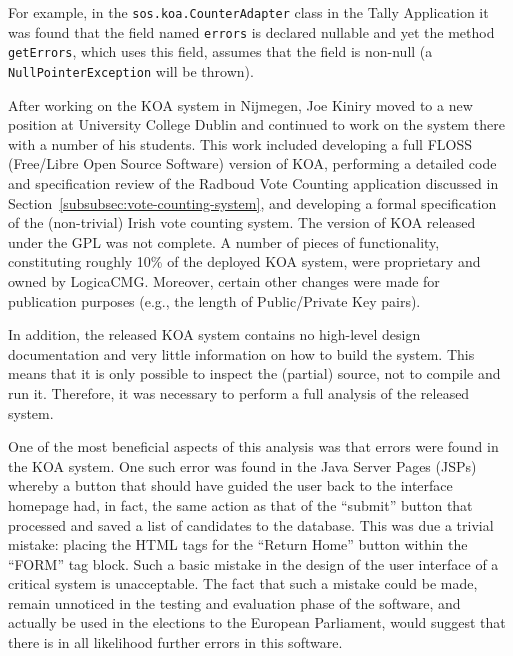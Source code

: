 \documentclass[times, 10pt, twocolumn]{article}
\begin{document}
For example, in the \texttt{sos.koa.CounterAdapter} class in the Tally 
Application it was found that the field named \texttt{errors} is declared 
nullable and yet the method \texttt{getErrors}, which uses this field, assumes 
that the field is non-null (a \texttt{NullPointerException} will be thrown).

After working on the KOA system in Nijmegen, Joe Kiniry moved to a new position 
at University College Dublin and continued to work on the system there with a 
number of his students.  This work included developing a full FLOSS (Free/Libre 
Open Source Software) version of KOA, performing a detailed code and 
specification review of the Radboud Vote Counting application discussed in 
Section~\ref{subsubsec:vote-counting-system}, and developing a formal 
specification of the (non-trivial) Irish vote counting system.
The version of KOA released under the GPL was not complete. A number of pieces 
of functionality, constituting roughly 10\% of the deployed KOA system, were 
proprietary and owned by LogicaCMG. Moreover, certain other changes were made 
for publication purposes (e.g., the length of Public/Private Key pairs).

In addition, the released KOA system contains no high-level design 
documentation and very little information on how to build the system. This 
means that it is only possible to inspect the (partial) source, not to compile 
and run it. Therefore, it was necessary to perform a full analysis of the 
released system\cite{Morkan05}.

One of the most beneficial aspects of this analysis was that errors were found 
in the KOA system. One such error was found in the Java Server Pages (JSPs) whereby a
button that 
should have guided the user back to the interface homepage had, in fact, the
same action as that of the ``submit'' button that processed and saved a list of 
candidates to the database. This was due a trivial mistake: placing the HTML 
tags for the ``Return Home'' button within the ``FORM'' tag block. Such a 
basic mistake in the design of the user interface of a 
critical system is unacceptable. The fact that such a mistake could be made, remain
unnoticed in
the testing and evaluation phase of the software, and actually be used in the 
elections to the European Parliament, would suggest that there is in all 
likelihood further errors in this software.
\end{document}
